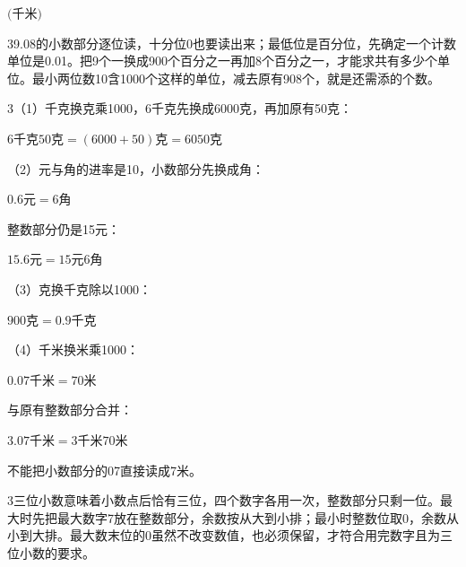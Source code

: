 \documentclass[multi=snippet,border={5bp 20bp 5bp 5bp}]{standalone}
\newenvironment{snippet}[3]{\begin{minipage}{#1bp}\color{answerred}\fontsize{#2}{#3}\selectfont\raggedright}{\end{minipage}}
\begin{document}
\begin{snippet}{80}{9.0}{14}\SourceSans\setlength{\mathindent}{2bp}\(\text{(千米)}\)\end{snippet}
\begin{snippet}{505}{11.5}{14}\begin{multicols}{3}\raggedcolumns 9.08的小数部分逐位读，十分位0也要读出来；最低位是百分位，先确定一个计数单位是0.01。把9个一换成900个百分之一再加8个百分之一，才能求共有多少个单位。最小两位数10含1000个这样的单位，减去原有908个，就是还需添的个数。\end{multicols}\end{snippet}
\begin{snippet}{505}{11.5}{14}\begin{multicols}{3}\raggedcolumns （1）千克换克乘1000，6千克先换成6000克，再加原有50克：\par\noindent\(\displaystyle 6\text{千克}50\text{克}=(6000+50)\text{克}=6050\text{克}\)\allowbreak \par（2）元与角的进率是10，小数部分先换成角：\par\noindent\(\displaystyle 0.6\text{元}=6\text{角}\)\allowbreak \par 整数部分仍是15元：\par\noindent\(\displaystyle 15.6\text{元}=15\text{元}6\text{角}\)\allowbreak \par（3）克换千克除以1000：\par\noindent\(\displaystyle 900\text{克}=0.9\text{千克}\)\allowbreak \par（4）千米换米乘1000：\par\noindent\(\displaystyle 0.07\text{千米}=70\text{米}\)\allowbreak \par 与原有整数部分合并：\par\noindent\(\displaystyle 3.07\text{千米}=3\text{千米}70\text{米}\)\allowbreak \par 不能把小数部分的07直接读成7米。\end{multicols}\end{snippet}
\begin{snippet}{505}{11.5}{14}\begin{multicols}{3}\raggedcolumns 三位小数意味着小数点后恰有三位，四个数字各用一次，整数部分只剩一位。最大时先把最大数字7放在整数部分，余数按从大到小排；最小时整数位取0，余数从小到大排。最大数末位的0虽然不改变数值，也必须保留，才符合用完数字且为三位小数的要求。\end{multicols}\end{snippet}
\end{document}
